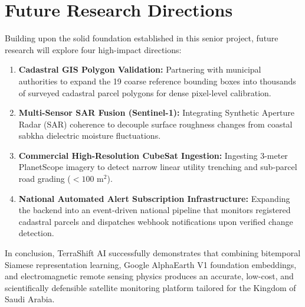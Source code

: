 \section{Future Research Directions}
\label{sec:concl_future_work}
Building upon the solid foundation established in this senior project, future research will explore four high-impact directions:

\begin{enumerate}
    \item \textbf{Cadastral GIS Polygon Validation:} Partnering with municipal authorities to expand the 19 coarse reference bounding boxes into thousands of surveyed cadastral parcel polygons for dense pixel-level calibration.
    \item \textbf{Multi-Sensor SAR Fusion (Sentinel-1):} Integrating Synthetic Aperture Radar (SAR) coherence to decouple surface roughness changes from coastal sabkha dielectric moisture fluctuations.
    \item \textbf{Commercial High-Resolution CubeSat Ingestion:} Ingesting 3-meter PlanetScope imagery to detect narrow linear utility trenching and sub-parcel road grading ($<100\text{ m}^2$).
    \item \textbf{National Automated Alert Subscription Infrastructure:} Expanding the backend into an event-driven national pipeline that monitors registered cadastral parcels and dispatches webhook notifications upon verified change detection.
\end{enumerate}

In conclusion, TerraShift AI successfully demonstrates that combining bitemporal Siamese representation learning, Google AlphaEarth V1 foundation embeddings, and electromagnetic remote sensing physics produces an accurate, low-cost, and scientifically defensible satellite monitoring platform tailored for the Kingdom of Saudi Arabia.
\newpage
